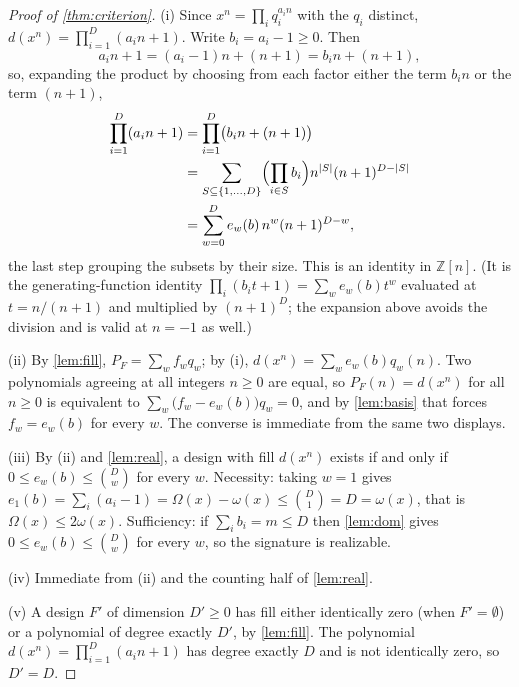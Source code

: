 \documentclass[11pt]{amsart}
\theoremstyle{definition}
\theoremstyle{remark}
\begin{document}
\begin{proof}[Proof of \cref{thm:criterion}]
(i) Since $x^{n} = \prod_{i}q_{i}^{a_{i}n}$ with the $q_{i}$ distinct, $d(x^{n}) = \prod_{i=1}^{D}(a_{i}n+1)$. Write $b_{i}=a_{i}-1 \ge 0$. Then
\[
  a_{i}n+1 = (a_{i}-1)n + (n+1) = b_{i}n + (n+1),
\]
so, expanding the product by choosing from each factor either the term $b_{i}n$ or the term $(n+1)$,
\begin{align*}
  \prod_{i=1}^{D}(a_{i}n+1)
  &= \prod_{i=1}^{D}\bigl(b_{i}n+(n+1)\bigr)\\
  &= \sum_{S \subseteq \{1,\dots,D\}} \Bigl(\prod_{i \in S}b_{i}\Bigr) n^{|S|}(n+1)^{D-|S|}\\
  &= \sum_{w=0}^{D} e_{w}(b)\,n^{w}(n+1)^{D-w},
\end{align*}
the last step grouping the subsets by their size. This is an identity in $\mathbb{Z}[n]$. (It is the generating-function identity $\prod_{i}(b_{i}t+1)=\sum_{w}e_{w}(b)t^{w}$ evaluated at $t=n/(n+1)$ and multiplied by $(n+1)^{D}$; the expansion above avoids the division and is valid at $n=-1$ as well.)

(ii) By \cref{lem:fill}, $P_{F} = \sum_{w}f_{w}q_{w}$; by (i), $d(x^{n}) = \sum_{w}e_{w}(b)q_{w}(n)$. Two polynomials agreeing at all integers $n \ge 0$ are equal, so $P_{F}(n)=d(x^{n})$ for all $n \ge 0$ is equivalent to $\sum_{w}\bigl(f_{w}-e_{w}(b)\bigr)q_{w}=0$, and by \cref{lem:basis} that forces $f_{w}=e_{w}(b)$ for every $w$. The converse is immediate from the same two displays.

(iii) By (ii) and \cref{lem:real}, a design with fill $d(x^{n})$ exists if and only if $0 \le e_{w}(b) \le \binom{D}{w}$ for every $w$. Necessity: taking $w=1$ gives $e_{1}(b)=\sum_{i}(a_{i}-1)=\Omega(x)-\omega(x) \le \binom{D}{1}=D=\omega(x)$, that is $\Omega(x) \le 2\omega(x)$. Sufficiency: if $\sum_{i}b_{i}=m \le D$ then \cref{lem:dom} gives $0 \le e_{w}(b) \le \binom{D}{w}$ for every $w$, so the signature is realizable.

(iv) Immediate from (ii) and the counting half of \cref{lem:real}.

(v) A design $F'$ of dimension $D' \ge 0$ has fill either identically zero (when $F'=\emptyset$) or a polynomial of degree exactly $D'$, by \cref{lem:fill}. The polynomial $d(x^{n}) = \prod_{i=1}^{D}(a_{i}n+1)$ has degree exactly $D$ and is not identically zero, so $D'=D$.
\end{proof}
\end{document}
